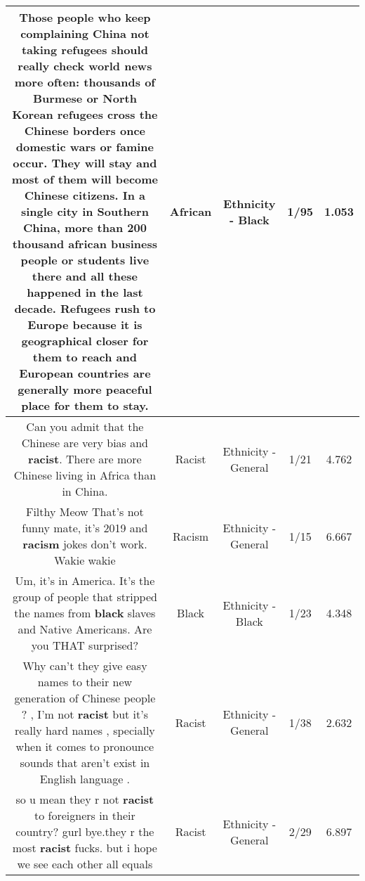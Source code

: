 \documentclass[11pt]{article}
\newlength\mylength
\begin{document}
\begin{center}
\begin{longtable}{|C{.65\mylength}|C{.30\mylength}|C{.12\mylength}|C{.12\mylength}|C{.12\mylength}|}
  \small Those people who keep complaining China not taking refugees should really check world news more often: thousands of Burmese or North Korean refugees cross the Chinese borders once domestic wars or famine occur. They will stay and most of them will become Chinese citizens. In a single city in Southern China, more than 200 thousand \textbf{african} business people or students live there and all these happened in the last decade. Refugees rush to Europe because it is geographical closer for them to reach and European countries are generally more peaceful  place for them to stay.\normalsize   & African & Ethnicity - Black & 1/95 & 1.053 \\  \hline
  \small Can you admit that the Chinese are very bias and \textbf{racist}. There are more Chinese living in Africa than in China.\normalsize   & Racist & Ethnicity - General & 1/21 & 4.762 \\  \hline
  \small Filthy Meow That's not funny mate, it's 2019 and \textbf{racism} jokes don't work. Wakie wakie\normalsize   & Racism & Ethnicity - General & 1/15 & 6.667 \\  \hline
  \small Um, it's in America. It's the group of people that stripped the names from \textbf{black} slaves and Native Americans. Are you THAT surprised?\normalsize   & Black & Ethnicity - Black & 1/23 & 4.348 \\  \hline
  \small Why can't they give easy names to their new generation of Chinese people ? , I'm not \textbf{racist} but it's really hard names , specially when it comes to pronounce sounds that aren't exist in English language .\normalsize   & Racist & Ethnicity - General & 1/38 & 2.632 \\  \hline
  \small so u mean they r not \textbf{racist} to foreigners in their country? gurl bye.they r the most \textbf{racist} fucks. but i hope we see each other all equals\normalsize   & Racist & Ethnicity - General & 2/29 & 6.897 \\  \hline

\end{longtable}
\end{center}
\end{document}
